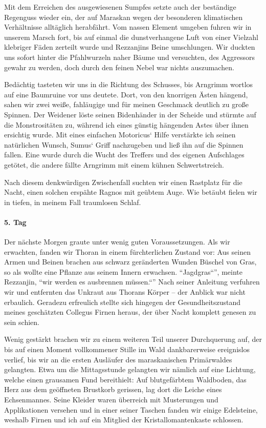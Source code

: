 Mit dem Erreichen des ausgewiesenen Sumpfes setzte auch der beständige Regenguss wieder ein, der auf Maraskan wegen der besonderen klimatischen Verhältnisse alltäglich herabfährt. Vom nassen Element umgeben fuhren wir in unserem Marsch fort, bis auf einmal die dunstverhangene Luft von einer Vielzahl klebriger Fäden zerteilt wurde und Rezzanjins Beine umschlungen. Wir duckten uns sofort hinter die Pfahlwurzeln naher Bäume und versuchten, des Aggressors gewahr zu werden, doch durch den feinen Nebel war nichts auszumachen. 

Bedächtig tasteten wir uns in die Richtung des Schusses, bis Arngrimm wortlos auf eine Baumruine vor uns deutete. Dort, von den knorrigen Ästen hängend, sahen wir zwei weiße, fahläugige und für meinen Geschmack deutlich zu große Spinnen. Der Weidener löste seinen Bidenhänder in der Scheide und stürmte auf die Monstrositäten zu, während ich eines günstig hängenden Astes über ihnen ersichtig wurde. Mit eines einfachen Motoricus` Hilfe verstärkte ich seinen natürlichen Wunsch, Sumus` Griff nachzugeben und ließ ihn auf die Spinnen fallen. Eine wurde durch die Wucht des Treffers und des eigenen Aufschlages getötet, die andere fällte Arngrimm mit einem kühnen Schwertstreich. 

Nach diesem denkwürdigen Zwischenfall suchten wir einen Rastplatz für die Nacht, einen solchen erspähte Ragnos mit geübtem Auge. Wie betäubt fielen wir in tiefen, in meinem Fall traumlosen Schlaf.

\paragraph{5. Tag}
Der nächste Morgen graute unter wenig guten Voraussetzungen. Als wir erwachten, fanden wir Thoran in einem fürchterlichen Zustand vor: Aus seinen Armen und Beinen brachen aus schwarz geränderten Wunden Büschel von Gras, so als wollte eine Pflanze aus seinem Innern erwachsen. ``Jagdgras``'', meinte Rezzanjin, ``wir werden es ausbrennen müssen.``'' Nach seiner Anleitung verfuhren wir und entfernten das Unkraut aus Thorans Körper -- der Anblick war nicht erbaulich. Geradezu erfreulich stellte sich hingegen der Gesundheitszustand meines geschätzten Collegus Firnen heraus, der über Nacht komplett genesen zu sein schien. 

Wenig gestärkt brachen wir zu einem weiteren Teil unserer Durchquerung auf, der bis auf einen Moment vollkommener Stille im Wald dankbarerweise ereignislos verlief, bis wir an die ersten Ausläufer des maraskanischen Primärwaldes gelangten. Etwa um die Mittagsstunde gelangten wir nämlich auf eine Lichtung, welche einen grausamen Fund bereithielt: Auf blutgefärbtem Waldboden, das Herz aus dem geöffneten Brustkorb gerissen, lag dort die Leiche eines Echsenmannes. Seine Kleider waren überreich mit Musterungen und Applikationen versehen und in einer seiner Taschen fanden wir einige Edelsteine, weshalb Firnen und ich auf ein Mitglied der Kristallomantenkaste schlossen. 

